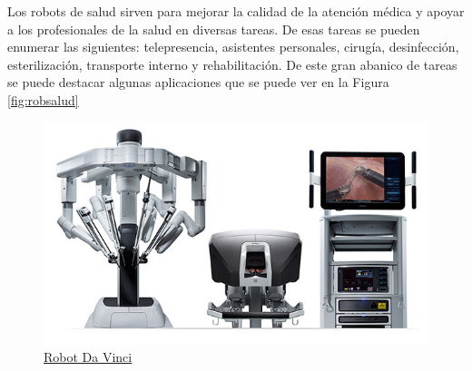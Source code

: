 Los robots de salud sirven para mejorar la calidad de la atención médica y apoyar a los profesionales de la salud en diversas tareas. De esas tareas se pueden enumerar las siguientes: telepresencia, asistentes personales, cirugía, desinfección, esterilización, transporte interno y rehabilitación. De este gran abanico de tareas se puede destacar algunas aplicaciones que se puede ver en la Figura \ref{fig:robsalud}\\

\begin{figure}[ht!]
	\centering
	\begin{minipage}{0.5\linewidth}
		\centering
		\includegraphics[width=\linewidth]{figs/davincimed.png}
		\caption*{\centering\href{https://www.abexsl.es/es/sistema-robotico-da-vinci/que-es}{Robot Da Vinci}}
	\end{minipage}
    \hspace{1 cm}
	\begin{minipage}{0.15\linewidth}
		\centering

\end{minipage}
\end{figure}
